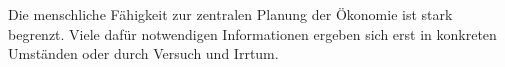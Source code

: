 Die menschliche Fähigkeit zur zentralen Planung der Ökonomie ist stark begrenzt.
Viele dafür notwendigen Informationen ergeben sich erst in konkreten Umständen oder durch Versuch und Irrtum.